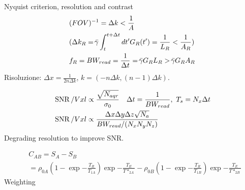\begin{frame}[allowframebreaks]{Nyquist criterion, resolution and contrast}
\begin{align*}
&(FOV)^{-1}=\Delta k<\frac{1}{A}\\
&(\Delta k_R=\gammabar\int_t^{t+\Delta t}d t'G_R(t')=\frac{1}{L_R}<\frac{1}{A_R})\\
&f_R=BW_{read}=\frac{1}{\Delta t}=\gammabar G_RL_R>\gammabar G_RA_R
\end{align*}
Risoluzione: $\Delta x=\frac{1}{2n\Delta k}$, $k=(-n\Delta k,(n-1)\Delta k)$.

\begin{align*}
&\operatorname{SNR}/Vxl\propto\frac{\sqrt{N_{aqr}}}{\sigma_0}\quad \Delta t= \frac{1}{BW_{read}},\ T_s=N_x\Delta t\\
&\operatorname{SNR}/Vxl\propto \frac{\Delta x\Delta y\Delta z\sqrt{N_a}}{BW_{read}/(N_xN_yN_z)}
\end{align*}
Degrading resolution to improve SNR.

\begin{align*}
&C_{AB}=S_A-S_B\\
&=\rho_{0A}(1-\exp{-\frac{T_R}{T_{1A}}})\exp{-\frac{T_E}{T*_{2A}}}-\rho_{0B}(1-\exp{-\frac{T_R}{T_{1B}}})\exp{-\frac{T_E}{T*_{2B}}}
\end{align*}
Weighting
\end{frame}